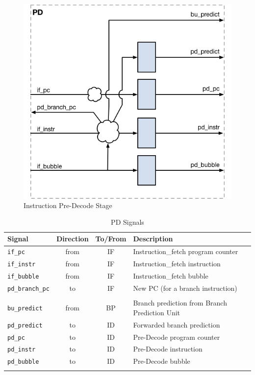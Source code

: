 \begin{figure}[th]
  \includegraphics{assets/img/Pipeline-PD}
  \caption{Instruction Pre-Decode Stage}
\end{figure}

\begin{longtable}[]{@{}lccl@{}}
	\toprule
	\textbf{Signal} & \textbf{Direction} & \textbf{To/From} & \textbf{Description}\tabularnewline
	\midrule

	\endhead
	
	\texttt{if\_pc}         & from & IF & Instruction\_fetch program counter\\
	\texttt{if\_instr}      & from & IF & Instruction\_fetch instruction\\
	\texttt{if\_bubble}     & from & IF & Instruction\_fetch bubble\\
	\texttt{pd\_branch\_pc} & to   & IF & New PC (for a branch instruction)\\
	& & &\\
	\texttt{bu\_predict}    & from & BP & Branch prediction from Branch Prediction Unit\\
	\texttt{pd\_predict }   & to   & ID & Forwarded branch prediction\\
	\texttt{pd\_pc}         & to   & ID & Pre-Decode program counter\\
	\texttt{pd\_instr}      & to   & ID & Pre-Decode instruction\\
	\texttt{pd\_bubble}     & to   & ID & Pre-Decode bubble\\
	\bottomrule
	\caption{PD Signals}
	\label{tab:pd-signals}
\end{longtable}

